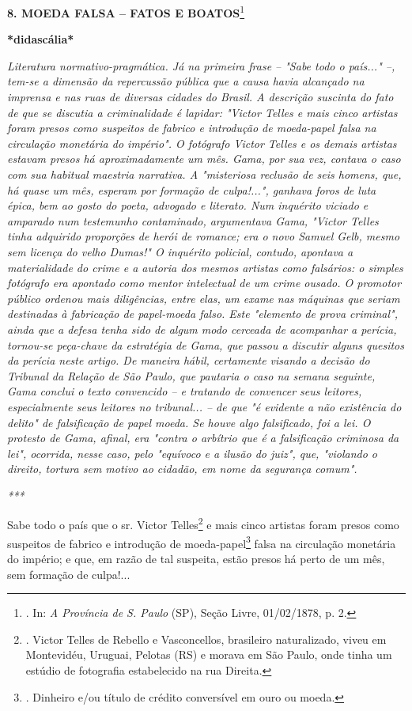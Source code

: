 \textbf{8. MOEDA FALSA -- FATOS E BOATOS}\footnote{. In: \emph{A
  Província de S. Paulo} (SP), Seção Livre, 01/02/1878, p. 2.}

\textbf{*didascália*}

\emph{Literatura normativo-pragmática. Já na primeira frase -- "Sabe
todo o país..." --, tem-se a dimensão da repercussão pública que a causa
havia alcançado na imprensa e nas ruas de diversas cidades do Brasil. A
descrição suscinta do fato de que se discutia a criminalidade é lapidar:
"Victor Telles e mais cinco artistas foram presos como suspeitos de
fabrico e introdução de moeda-papel falsa na circulação monetária do
império". O fotógrafo Victor Telles e os demais artistas estavam presos
há aproximadamente um mês. Gama, por sua vez, contava o caso com sua
habitual maestria narrativa. A "misteriosa reclusão de seis homens, que,
há quase um mês, esperam por formação de culpa!...", ganhava foros de
luta épica, bem ao gosto do poeta, advogado e literato. Num inquérito
viciado e amparado num testemunho contaminado, argumentava Gama, "Victor
Telles tinha adquirido proporções de herói de romance; era o novo Samuel
Gelb, mesmo sem licença do velho Dumas!" O inquérito policial, contudo,
apontava a materialidade do crime e a autoria dos mesmos artistas como
falsários: o simples fotógrafo era apontado como mentor intelectual de
um crime ousado. O promotor público ordenou mais diligências, entre
elas, um exame nas máquinas que seriam destinadas à fabricação de
papel-moeda falso. Este "elemento de prova criminal", ainda que a defesa
tenha sido de algum modo cerceada de acompanhar a perícia, tornou-se
peça-chave da estratégia de Gama, que passou a discutir alguns quesitos
da perícia neste artigo. De maneira hábil, certamente visando a decisão
do Tribunal da Relação de São Paulo, que pautaria o caso na semana
seguinte, Gama conclui o texto convencido -- e tratando de convencer
seus leitores, especialmente seus leitores no tribunal... -- de que "é
evidente a não existência do delito" de falsificação de papel moeda. Se
houve algo falsificado, foi a lei. O protesto de Gama, afinal, era
"contra o arbítrio que é a falsificação criminosa da lei", ocorrida,
nesse caso, pelo "equívoco e a ilusão do juiz", que, "violando o
direito, tortura sem motivo ao cidadão, em nome da segurança comum". }

\emph{***}

Sabe todo o país que o sr. Victor Telles\footnote{. Victor Telles de
  Rebello e Vasconcellos, brasileiro naturalizado, viveu em Montevidéu,
  Uruguai, Pelotas (RS) e morava em São Paulo, onde tinha um estúdio de
  fotografia estabelecido na rua Direita.} e mais cinco artistas foram
presos como suspeitos de fabrico e introdução de moeda-papel\footnote{.
  Dinheiro e/ou título de crédito conversível em ouro ou moeda.} falsa
na circulação monetária do império; e que, em razão de tal suspeita,
estão presos há perto de um mês, sem formação de culpa!...

